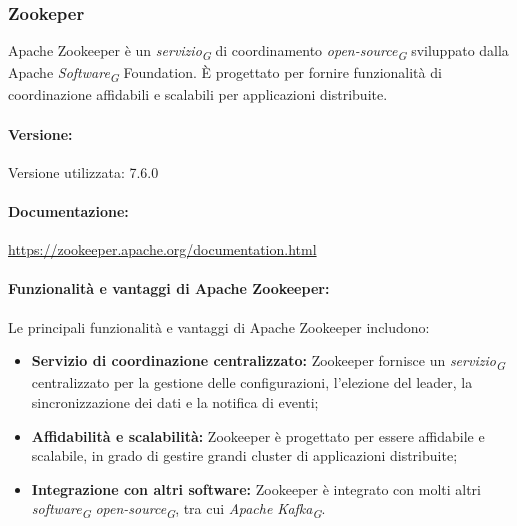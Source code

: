 \subsubsection{Zookeper}
Apache Zookeeper è un \textit{servizio}\textsubscript{\textit{G}} di coordinamento \textit{open-source}\textsubscript{\textit{G}} sviluppato dalla Apache \textit{Software}\textsubscript{\textit{G}} Foundation. È progettato per fornire funzionalità di coordinazione affidabili e scalabili per applicazioni distribuite.

\paragraph{Versione:}
Versione utilizzata: 7.6.0

\paragraph{Documentazione:}
\url{https://zookeeper.apache.org/documentation.html}
\paragraph{Funzionalità e vantaggi di Apache Zookeeper:}
Le principali funzionalità e vantaggi di Apache Zookeeper includono:
\begin{itemize}
    \item \textbf{Servizio di coordinazione centralizzato:} Zookeeper fornisce un \textit{servizio}\textsubscript{\textit{G}} centralizzato per la gestione delle configurazioni, l'elezione del leader, la sincronizzazione dei dati e la notifica di eventi;
    \item \textbf{Affidabilità e scalabilità:} Zookeeper è progettato per essere affidabile e scalabile, in grado di gestire grandi cluster di applicazioni distribuite;
    \item \textbf{Integrazione con altri software:} Zookeeper è integrato con molti altri \textit{software}\textsubscript{\textit{G}} \textit{open-source}\textsubscript{\textit{G}}, tra cui \textit{Apache Kafka}\textsubscript{\textit{G}}.
\end{itemize}

